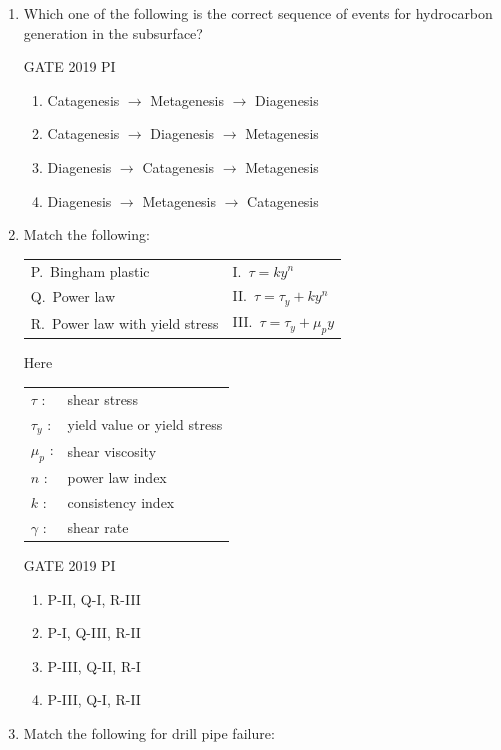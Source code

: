 \documentclass[journal,12pt,onecolumn]{IEEEtran}
\theoremstyle{remark}
\begin{document}
\begin{enumerate}
\item Which one of the following is the correct sequence of events for hydrocarbon generation in the subsurface?

\hfill{GATE 2019 PI}

\begin{multicols}{2}
\begin{enumerate}
    \item Catagenesis $\rightarrow$ Metagenesis $\rightarrow$ Diagenesis
    \item Catagenesis $\rightarrow$ Diagenesis $\rightarrow$ Metagenesis
    \item Diagenesis $\rightarrow$ Catagenesis $\rightarrow$ Metagenesis
    \item Diagenesis $\rightarrow$ Metagenesis $\rightarrow$ Catagenesis
\end{enumerate}
\end{multicols}

\item Match the following:

\begin{tabular}{ll}
P.\ Bingham plastic               & I.\ $\tau = ky^n$ \\
Q.\ Power law                     & II.\ $\tau = \tau_y + ky^n$ \\
R.\ Power law with yield stress   & III.\ $\tau = \tau_y + \mu_p y$ \\
\end{tabular}

Here

\begin{tabular}{ll}
$\tau$ : & shear stress \\
$\tau_y$ : & yield value or yield stress \\
$\mu_p$ : & shear viscosity \\
$n$ : & power law index \\
$k$ : & consistency index \\
$\gamma$ : & shear rate \\
\end{tabular}

\hfill{GATE 2019 PI}

\begin{multicols}{2}
\begin{enumerate}
    \item P-II, Q-I, R-III
    \item P-I, Q-III, R-II
    \item P-III, Q-II, R-I
    \item P-III, Q-I, R-II
\end{enumerate}
\end{multicols}
\item Match the following for drill pipe failure:


\end{enumerate}
\end{document}
